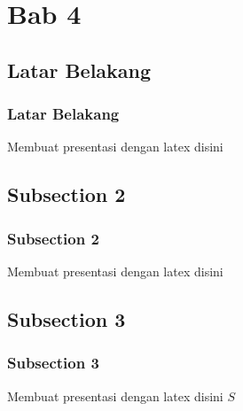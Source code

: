 \section{Bab 4}
\subsection{Latar Belakang}
\begin{frame}
\frametitle{Latar Belakang}
Membuat presentasi dengan latex disini
\end{frame}

\subsection{Subsection 2}
\begin{frame}
\frametitle{Subsection 2}
Membuat presentasi dengan latex disini
\end{frame}

\subsection{Subsection 3}
\begin{frame}
\frametitle{Subsection 3}
Membuat presentasi dengan latex disini $S$
\end{frame}
